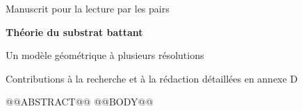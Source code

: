 \documentclass[11pt,a4paper]{article}
\begin{document}
{\sffamily\color{bst}\small Manuscrit pour la lecture par les pairs\par}\vspace{1.4cm}
{\sffamily\bfseries\fontsize{30}{36}\selectfont Théorie du substrat battant\par}\vspace{.3cm}
{\sffamily\Large Un modèle géométrique à plusieurs résolutions\par}\vspace{.75cm}
{\small Contributions à la recherche et à la rédaction détaillées en annexe D\par}\vspace{1cm}
@@ABSTRACT@@
\clearpage\tableofcontents\clearpage
@@BODY@@
\end{document}
